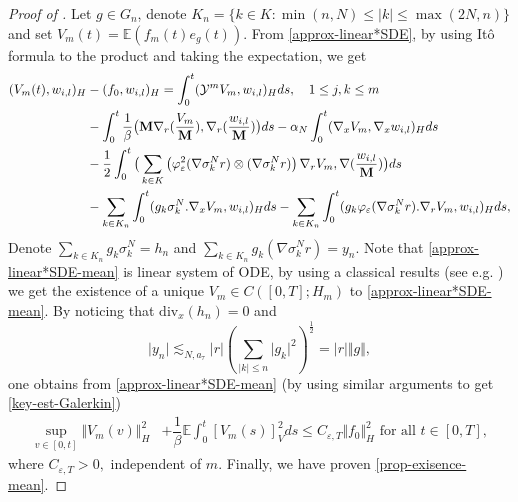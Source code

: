 \documentclass[a4paper,12pt, reqno]{amsart}
\newcommand{\E}{\ensuremath{\mathbb{E}}}
\newcommand{\Div}{\text{div}}
\begin{document}
    \begin{proof}[Proof of  ]
	Let $g\in   G_n$,   denote  $K_n=\{k\in K: \min(n,N) \leq    \vert   k\vert  \leq    \max(2N,n)\}$  and set $V_m(t)=\E(f_m(t)e_g(t)).$      
    From \eqref{approx-linear*SDE},   by  using   It\^o formula to the
	product and taking the expectation,    we  get 
    \begin{align}\label{approx-linear*SDE-mean}
    (V_m(t),w_{i,l})_H&-(f_{0},w_{i,l})_H=\int_0^t(\mathcal{Y}^mV_m,w_{i,l})_Hds, \quad 1\leq j,k \leq m \notag\\
    &	-\int_0^t\dfrac{1}{\beta}\big(\mathbf{M}\nabla_r(\dfrac{V_m}{\mathbf{M}}),\nabla_r(\dfrac{w_{i,l}}{\mathbf{M}})\big)ds -\alpha_N\int_0^t(\nabla_x V_m,\nabla_x w_{i,l})_Hds \notag\\&- \dfrac{1}{2}\int_0^t\big(\sum_{k\in K}\left(\varphi_\varepsilon^2(\nabla \sigma_k^Nr) \otimes (\nabla \sigma_k^Nr)\right) \nabla_rV_m,\nabla(\dfrac{w_{i,l}}{\mathbf{M}})\big)ds\\
            &-\sum_{k\in K_n }\int_0^t(g_k\sigma_k^N.\nabla_xV_m,w_{i,l})_H ds -\sum_{k\in K_n}\int_0^t(g_k\varphi_\varepsilon(\nabla \sigma_k^Nr).\nabla_rV_m,w_{i,l})_H ds,
 \notag
\end{align}
	Denote    $\displaystyle\sum_{k\in K_n}g_k\sigma_k^N=h_n$    and $\displaystyle\sum_{k\in K_n}g_k (\nabla \sigma_k^Nr)=y_n$.   Note that
	\eqref{approx-linear*SDE-mean}  is  linear  system  of  ODE,    by  using   a   classical   results  (see    e.g.    \cite[Chapter   V]{Oksendal2013})  we  get the    existence of   a   unique  $V_m\in C([0,T];H_m)$  to   \eqref{approx-linear*SDE-mean}.
    By  noticing  that  
		$\Div_x(h_n)=0$ and     $$
		\vert  y_n\vert      \lesssim_{N,a_\tau}   \vert   r\vert    \displaystyle(\sum_{    \vert   k\vert  \leq    n}\vert   g_k\vert^2)^{\frac{1}{2}}=\vert   r\vert  \Vert  g\Vert
		,$$  one obtains from \eqref{approx-linear*SDE-mean}    (by using  similar arguments to get \eqref{key-est-Galerkin})
        \begin{align}\label{key-est-Galerkin-Vm}
 \sup_{v\in[0,t]} \Vert V_m(v)\Vert_H^2 &+\dfrac{1}{\beta}\E\int_0^t [V_m(s)]_V^2ds\leq C_{\varepsilon,T}\Vert f_{0}\Vert_H^2 \text{ for all } t\in [0,T],
\end{align}
where $C_{\varepsilon,T}>0,$  independent of $m.$ Finally, we have proven \autoref{prop-exisence-mean}.
\end{proof}
\end{document}
